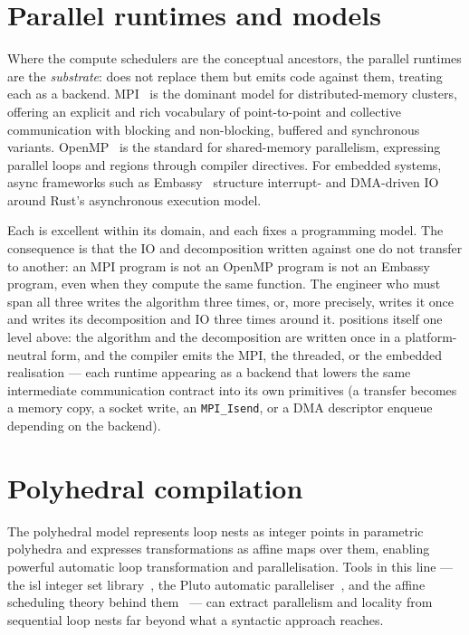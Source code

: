 \section{Parallel runtimes and models}\label{sec:pa-runtimes}

Where the compute schedulers are the conceptual ancestors, the parallel runtimes
are the \emph{substrate}: \nuc{} does not replace them but emits code against
them, treating each as a backend. MPI~\cite{mpiforum2021} is the dominant model
for distributed-memory clusters, offering an explicit and rich vocabulary of
point-to-point and collective communication with blocking and non-blocking,
buffered and synchronous variants. OpenMP~\cite{dagum1998openmp} is the
standard for shared-memory parallelism, expressing parallel loops and regions
through compiler directives. For embedded systems, async frameworks such as
Embassy~\cite{embassy} structure interrupt- and DMA-driven IO around Rust's
asynchronous execution model.

Each is excellent within its domain, and each fixes a programming model. The
consequence is that the IO and decomposition written against one do not transfer
to another: an MPI program is not an OpenMP program is not an Embassy program,
even when they compute the same function. The engineer who must span all three
writes the algorithm three times, or, more precisely, writes it once and writes
its decomposition and IO three times around it. \nuc{} positions itself one level
above: the algorithm and the decomposition are written once in a
platform-neutral form, and the compiler emits the MPI, the threaded, or the
embedded realisation --- each runtime appearing as a backend that lowers the same
intermediate communication contract into its own primitives (a transfer becomes a
memory copy, a socket write, an \texttt{MPI\_Isend}, or a DMA descriptor enqueue
depending on the backend).

\section{Polyhedral compilation}\label{sec:pa-polyhedral}

The polyhedral model represents loop nests as integer points in parametric
polyhedra and expresses transformations as affine maps over them, enabling
powerful automatic loop transformation and parallelisation. Tools in this line
--- the isl integer set library~\cite{verdoolaege2010isl}, the Pluto automatic
paralleliser~\cite{bondhugula2008pluto}, and the affine scheduling theory behind
them~\cite{feautrier1992scheduling} --- can extract parallelism and locality from
sequential loop nests far beyond what a syntactic approach reaches.

